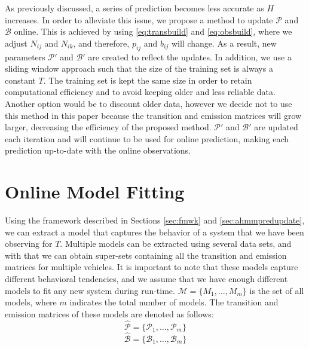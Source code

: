 \documentclass[letterpaper, 10 pt, conference]{ieeeconf}  %
\newcommand\NB[1]{$\spadesuit$\footnote{NB: #1}}
\newcommand\RP[1]{$\clubsuit$\footnote{RP: #1}}
\begin{document}
As previously discussed, a series of prediction becomes less accurate as $H$ increases. In order to alleviate this issue, we propose a method to update $\mathcal{P}$ and $\mathcal{B}$ online. This is achieved by using \eqref{eq:transbuild} and \eqref{eq:obsbuild}, where we adjust $N_{ij}$ and $N_{ik}$, and therefore, $p_{ij}$ and $b_{ij}$ will change. As a result, new parameters $\mathcal{P'}$ and $\mathcal{B'}$ are created to reflect the updates. In addition, we use a sliding window approach such that the size of the training set is always a constant $T$. %
The training set is kept the same size in order to retain computational efficiency and to avoid keeping older and less reliable data. Another option would be to discount older data, however we decide not to use this method in this paper because the transition and emission matrices will grow larger, decreasing the efficiency of the proposed method. %
$\mathcal{P'}$ and $\mathcal{B'}$ are updated each iteration and will continue to be used for online prediction, making each prediction up-to-date with the online observations.  %

\section{Online Model Fitting}\label{sec:omf}
Using the framework described in Sections \ref{sec:fmwk} and \ref{sec:ahmmpredupdate}, we can extract a model that captures the behavior of a system that we have been observing for $T$. Multiple models can be extracted using several data sets, and with that we can obtain super-sets containing all the transition and emission matrices for multiple vehicles. It is important to note that these models capture different behavioral tendencies, and we assume that we have enough different models to fit any new system during run-time. $\mathcal{M} = \{M_1,\ldots,M_m\}$ is the set of all models, where $m$ indicates the total number of models. The transition and emission matrices of these models are denoted as follows: %
\begin{equation}
    \hat{\mathcal{P}} = \{\mathcal{P}_1,\ldots,\mathcal{P}_m\}
\end{equation}
\begin{equation}
    \hat{\mathcal{B}} = \{\mathcal{B}_1,\ldots,\mathcal{B}_{m}\}
\end{equation}
\end{document}

